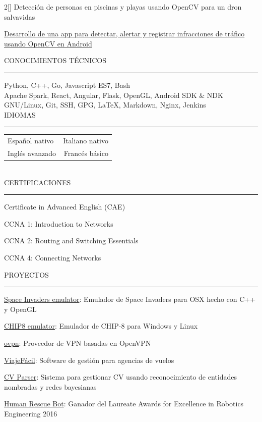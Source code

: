 \documentclass[a4paper, 12pt]{article}
\newenvironment{myparacol}[2][]{%
\begin{paracol}{#2}[#1]\setlength{\parindent}{0pt}}{%
\end{paracol}}
\begin{document}
\begin{sloppypar}
\begin{myparacol}{2}
    Detección de personas en piscinas y playas usando OpenCV para un dron salvavidas

    \href{https://github.com/hugo19941994/infrac-coche}{Desarrollo de una app para detectar, alertar y registrar infracciones de tráfico usando OpenCV en Android}
    \\

    \switchcolumn

    CONOCIMIENTOS TÉCNICOS
    \vspace{1mm}
    \hrule
    \kern9pt

    Python, C++, Go, Javascript ES7, Bash\\

    Apache Spark, React, Angular, Flask, OpenGL, Android SDK \& NDK\\

    GNU/Linux, Git, SSH, GPG, \LaTeX, Markdown, Nginx, Jenkins\\

    IDIOMAS
    \vspace{1mm}
    \hrule
    \kern9pt
    \noindent\begin{tabular}{ @{} l r }
        Español nativo & Italiano nativo\\
        Inglés avanzado & Francés básico\\
    \end{tabular}
    \\

    CERTIFICACIONES
    \vspace{1mm}
    \hrule
    \kern9pt
    Certificate in Advanced English (CAE)

    CCNA 1: Introduction to Networks

    CCNA 2: Routing and Switching Essentials

    CCNA 4: Connecting Networks

    \switchcolumn

    \noindent PROYECTOS
    \vspace{1mm}
    \hrule
    \kern9pt
    \href{https://github.com/hugo19941994/space-invaders-emu}{Space Invaders emulator}: Emulador de Space Invaders para OSX hecho con C++ y OpenGL

    \href{https://github.com/hugo19941994/chip8-emu}{CHIP8 emulator}: Emulador de CHIP-8 para Windows y Linux

    \href{https://vpn.hugofs.com}{ovpn}: Proveedor de VPN basadas en OpenVPN

    \href{https://github.com/hugo19941994/ViajeFacil}{ViajeFácil}: Software de gestión para agencias de vuelos

    \href{https://github.com/hugo19941994/cv-parser}{CV Parser}: Sistema para gestionar CV usando reconocimiento de entidades nombradas y redes bayesianas

    \href{https://github.com/hugo19941994/robot}{Human Rescue Bot}: Ganador del Laureate Awards for Excellence in Robotics Engineering 2016

\end{myparacol}
\end{sloppypar}
\end{document}
